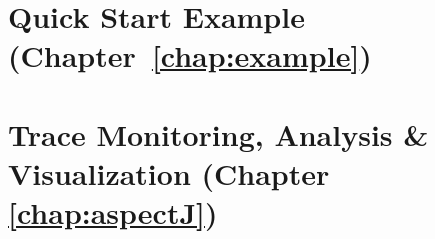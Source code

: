 \section{Quick Start Example (Chapter~\ref{chap:example})}\label{sec:appendix:manualInstrumentation:output}

\newpage

\newpage	
\section{Trace Monitoring, Analysis \& Visualization (Chapter \ref{chap:aspectJ})}
